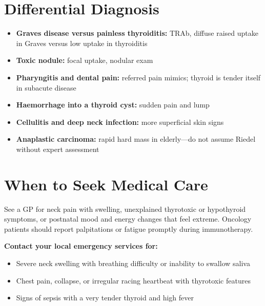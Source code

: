 \section*{Differential Diagnosis}
\begin{itemize}
    \item \textbf{Graves disease versus painless thyroiditis:} TRAb, diffuse raised uptake in Graves versus low uptake in thyroiditis
    \item \textbf{Toxic nodule:} focal uptake, nodular exam
    \item \textbf{Pharyngitis and dental pain:} referred pain mimics; thyroid is tender itself in subacute disease
    \item \textbf{Haemorrhage into a thyroid cyst:} sudden pain and lump
    \item \textbf{Cellulitis and deep neck infection:} more superficial skin signs
    \item \textbf{Anaplastic carcinoma:} rapid hard mass in elderly---do not assume Riedel without expert assessment
\end{itemize}

\section*{When to Seek Medical Care}
See a GP for neck pain with swelling, unexplained thyrotoxic or hypothyroid symptoms, or postnatal mood and energy changes that feel extreme. Oncology patients should report palpitations or fatigue promptly during immunotherapy.

\textbf{Contact your local emergency services for:}
\begin{itemize}
    \item Severe neck swelling with breathing difficulty or inability to swallow saliva
    \item Chest pain, collapse, or irregular racing heartbeat with thyrotoxic features
    \item Signs of sepsis with a very tender thyroid and high fever
\end{itemize}

